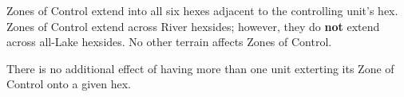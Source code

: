 \subsubsection{} Zones of Control extend into all six hexes adjacent to the controlling unit's hex. Zones of Control extend across River hexsides; however, they do \textbf{not} extend across all-Lake hexsides. No other terrain affects Zones of Control.

There is no additional effect of having more than one unit exterting its Zone of Control onto a given hex.